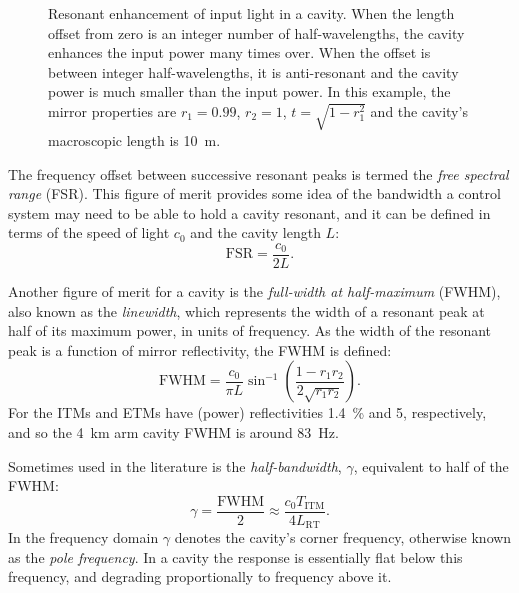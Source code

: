 \begin{figure}
  \centering
  
  \caption[Resonant enhancement of input light in a cavity]{\label{fig:cavity-fsr}Resonant enhancement of input light in a cavity. When the length offset from zero is an integer number of half-wavelengths, the cavity enhances the input power many times over. When the offset is between integer half-wavelengths, it is anti-resonant and the cavity power is much smaller than the input power. In this example, the mirror properties are $r_1 = 0.99$, $r_2 = 1$, $t = \sqrt{1 - r_1^2}$ and the cavity's macroscopic length is \SI{10}{\meter}.}
\end{figure}

The frequency offset between successive resonant peaks is termed the \emph{free spectral range} (\gls{FSR}). This figure of merit provides some idea of the bandwidth a control system may need to be able to hold a cavity resonant, and it can be defined in terms of the speed of light $c_0$ and the cavity length $L$:
\begin{equation}
  \label{eq:fsr}
  \text{FSR} = \frac{c_0}{2L}.
\end{equation}

Another figure of merit for a \FP{} cavity is the \emph{full-width at half-maximum} (\gls{FWHM}), also known as the \emph{linewidth}, which represents the width of a resonant peak at half of its maximum power, in units of frequency. As the width of the resonant peak is a function of mirror reflectivity, the \gls{FWHM} is defined:
\begin{equation}
  \text{FWHM} = \frac{c_0}{\pi L} \sin^{-1}{\left( \frac{1 - r_1 r_2}{2 \sqrt{r_1 r_2}} \right)}.
\end{equation}
For \ALIGO{} the \glspl{ITM} and \glspl{ETM} have (power) reflectivities \SI{1.4}{\percent} and \SI{5}{\ppm}, respectively, and so the \SI{4}{\kilo\meter} arm cavity \gls{FWHM} is around \SI{83}{\hertz}.

Sometimes used in the literature is the \emph{half-bandwidth}, $\gamma$, equivalent to half of the \gls{FWHM}:
\begin{equation}
  \gamma = \frac{\text{FWHM}}{2} \approx \frac{c_{0} T_{\textrm{ITM}}}{4 L_{\textrm{RT}}}.
\end{equation}
In the frequency domain $\gamma$ denotes the cavity's corner frequency, otherwise known as the \emph{pole frequency}. In a \FP{} cavity the response is essentially flat below this frequency, and degrading proportionally to frequency above it.

